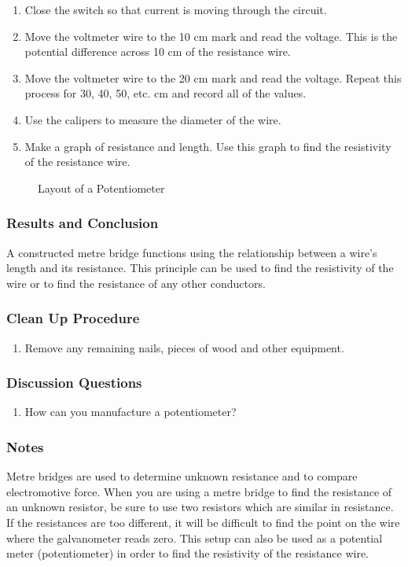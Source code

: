 \begin{enumerate}
\item{Close the switch so that current is moving through the circuit.} 
\item{Move the voltmeter wire to the 10 cm mark and read the voltage. This is the potential difference across 10 cm of the resistance wire.} 
\item{Move the voltmeter wire to the 20 cm mark and read the voltage. Repeat this process for 30, 40, 50, etc. cm and record all of the values.} 
\item{Use the calipers to measure the diameter of the wire.} 
\item{Make a graph of resistance and length. Use this graph to find the resistivity of the resistance wire.} 
\end{enumerate}

\begin{figure}
\begin{center}
\def\svgwidth{300pt}

\caption{Layout of a Potentiometer}
\label{fig:potential-metre}
\end{center}
\end{figure}

\subsubsection*{Results and Conclusion}
A constructed metre bridge functions using the relationship between a wire's length and its resistance. This principle can be used to find the resistivity of the wire or to find the resistance of any other conductors.  

\subsubsection*{Clean Up Procedure}
\begin{enumerate}
\item{Remove any remaining nails, pieces of wood and other equipment.} 
\end{enumerate}

\subsubsection*{Discussion Questions}
\begin{enumerate}
\item{How can you manufacture a potentiometer?}
\end{enumerate}

\subsubsection*{Notes}
Metre bridges are used to determine unknown resistance and to compare electromotive force.  When you are using a metre bridge to find the resistance of an unknown resistor, be sure to use two resistors which are similar in resistance.  If the resistances are too different, it will be difficult to find the point on the wire where the galvanometer reads zero.
This setup can also be used as a potential meter (potentiometer) in order to find the resistivity of the resistance wire.  

